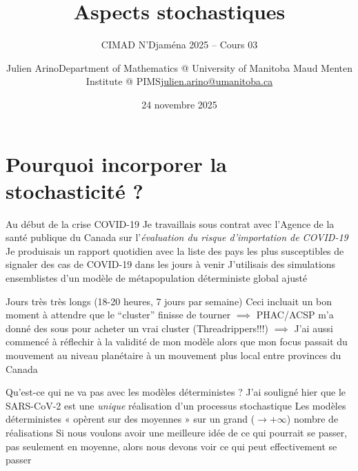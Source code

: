 \documentclass[aspectratio=169]{beamer}\usepackage[]{graphicx}\usepackage[]{xcolor}
\title{Aspects stochastiques}
\subtitle{CIMAD N'Djaména 2025 -- Cours 03}
\date{24 novembre 2025}
\author{\texorpdfstring{Julien Arino\newline Department of Mathematics @ University of Manitoba \newline Maud Menten Institute @ PIMS\newline\url{julien.arino@umanitoba.ca}}{Julien Arino}}
\begin{document}


\section{Pourquoi incorporer la stochasticité ?}

\begin{frame}{Au début de la crise COVID-19}
\bbullet 
Je travaillais sous contrat avec l'Agence de la santé publique du Canada sur l'\emph{évaluation du risque d'importation de COVID-19}
\vfill
\bbullet 
Je produisais un rapport quotidien avec la liste des pays les plus susceptibles de signaler des cas de COVID-19 dans les jours à venir
\vfill
\bbullet
J'utilisais des simulations ensemblistes d'un modèle de métapopulation déterministe global ajusté
\end{frame}


\begin{frame}
\bbullet Jours très très longs (18-20 heures, 7 jours par semaine)
\vfill
\bbullet Ceci incluait un bon moment à attendre que le ``cluster'' finisse de tourner
\vfill
$\implies$ PHAC/ACSP m'a donné des sous pour acheter un vrai cluster (Threadrippers!!!)
\vfill
$\implies$ J'ai aussi commencé à réflechir à la validité de mon modèle alors que mon focus passait du mouvement au niveau planétaire à un mouvement plus local entre provinces du Canada
\end{frame}

\begin{frame}{Qu'est-ce qui ne va pas avec les modèles déterministes ?}
\bbullet J'ai souligné hier que le SARS-CoV-2 est une \emph{unique} réalisation d'un processus stochastique
\vfill
\bbullet Les modèles déterministes « opèrent sur des moyennes » sur un grand ($\to +\infty$) nombre de réalisations
\vfill
\bbullet Si nous voulons avoir une meilleure idée de ce qui pourrait se passer, pas seulement en moyenne, alors nous devons voir ce qui peut effectivement se passer
\end{frame}
\end{document}
